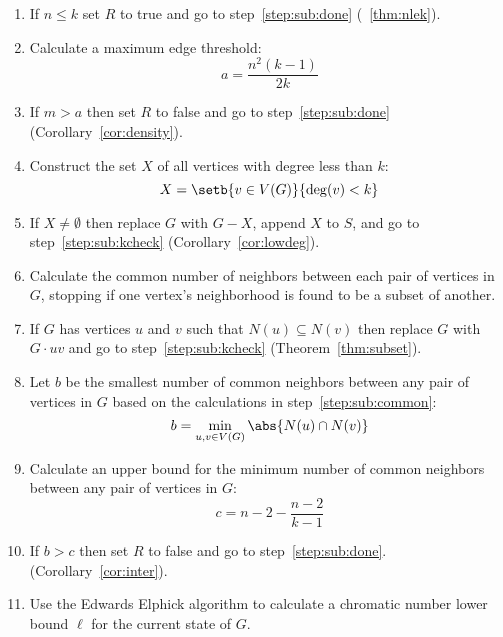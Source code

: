 \begin{enumerate}
\item\label{step:sub:kcheck} If \(n\le k\) set \(R\) to true and go to step~\ref{step:sub:done}
  (\theoremname~\ref{thm:nlek}).

\item\label{step:sub:ecalc} Calculate a maximum edge threshold:
  \[a=\frac{n^2(k-1)}{2k}\]

\item\label{step:sub:echeck} If \(m>a\) then set \(R\) to false and go to step~\ref{step:sub:done}
  (Corollary~\ref{cor:density}).

\item\label{step:sub:xcalc} Construct the set \(X\) of all vertices with degree less than \(k\):
  \[X=\setb{v\in V(G)}{\deg(v)<k}\]

\item\label{step:sub:xcheck} If \(X\ne\emptyset\) then replace \(G\) with \(G-X\), append \(X\) to \(S\), and go to
  step~\ref{step:sub:kcheck} (Corollary~\ref{cor:lowdeg}).

\item\label{step:sub:common} Calculate the common number of neighbors between each pair of vertices in \(G\),
  stopping if one vertex's neighborhood is found to be a subset of another.

\item\label{step:sub:subset} If \(G\) has vertices \(u\) and \(v\) such that \(N(u)\subseteq N(v)\) then replace
  \(G\) with \(G\cdot uv\) and go to step~\ref{step:sub:kcheck} (Theorem~\ref{thm:subset}).

\item\label{step:sub:select} Let \(b\) be the smallest number of common neighbors between any pair of vertices in
  \(G\) based on the calculations in step~\ref{step:sub:common}:
  \[b=\min_{u,v\in V(G)}\abs{N(u)\cap N(v)}\]

\item\label{step:sub:ubcalc} Calculate an upper bound for the minimum number of common neighbors between any pair
  of vertices in \(G\):
  \[c=n-2-\frac{n-2}{k-1}\]

\item\label{step:sub:ubcheck} If \(b>c\) then set \(R\) to false and go to step~\ref{step:sub:done}.
  (Corollary~\ref{cor:inter}).

\item\label{step:sub:lower} Use the Edwards Elphick algorithm to calculate a chromatic number lower bound \(\ell\)
  for the current state of \(G\).


\end{enumerate}
